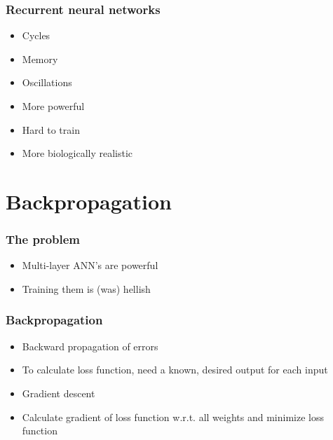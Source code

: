 \begin{frame}
  \frametitle{Recurrent neural networks}
  \begin{itemize}
  \item Cycles
  \item Memory
  \item Oscillations
  \item More powerful
  \item Hard to train 
  \item More biologically realistic
  \end{itemize}
\end{frame}

\section{Backpropagation}

\begin{frame}
\end{frame}

\begin{frame}
  \frametitle{The problem}
  \begin{itemize}
  \item Multi-layer ANN's are powerful
  \item Training them is (was) hellish
  \end{itemize}
\end{frame}

\begin{frame}
  \vspace{-8mm}
\end{frame}

\begin{frame}
  \vspace{-8mm}
\end{frame}

\begin{frame}
  \frametitle{Backpropagation}
  \begin{itemize}
  \item Backward propagation of errors
  \item To calculate loss function, need a known, desired output for each input
  \item Gradient descent
  \item Calculate gradient of loss function w.r.t. all weights and
    minimize loss function
  \end{itemize}

\end{frame}

